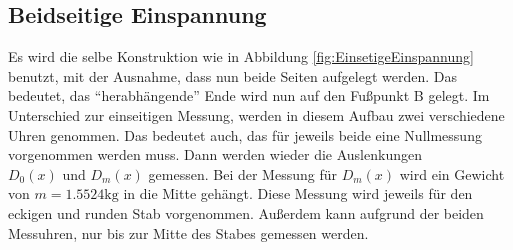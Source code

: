 \subsection{Beidseitige Einspannung}
\label{sec:BeidseitigeEinspannung}

Es wird die selbe Konstruktion wie in Abbildung \ref{fig:EinsetigeEinspannung} benutzt, mit der Ausnahme, dass nun beide Seiten aufgelegt werden.
Das bedeutet, das \enquote{herabhängende} Ende wird nun auf den Fußpunkt B gelegt.
Im Unterschied zur einseitigen Messung, werden in diesem Aufbau zwei verschiedene Uhren genommen.
Das bedeutet auch, das für jeweils beide eine Nullmessung vorgenommen werden muss.
Dann werden wieder die Auslenkungen $D_0 (x) \text{ und } D_m (x)$ gemessen.
Bei der Messung für $D_m (x)$ wird ein Gewicht von $m = 1.5524 \unit{\kilo\gram}$ in die Mitte gehängt.
Diese Messung wird jeweils für den eckigen und runden Stab vorgenommen.
Außerdem kann aufgrund der beiden Messuhren, nur bis zur Mitte des Stabes gemessen werden.